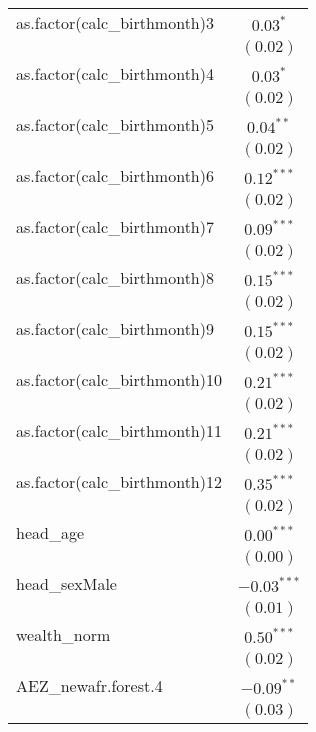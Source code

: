 \begin{longtable}{l c}
as.factor(calc\_birthmonth)3     & $0.03^{*}$     \\
                                 & $(0.02)$       \\
as.factor(calc\_birthmonth)4     & $0.03^{*}$     \\
                                 & $(0.02)$       \\
as.factor(calc\_birthmonth)5     & $0.04^{**}$    \\
                                 & $(0.02)$       \\
as.factor(calc\_birthmonth)6     & $0.12^{***}$   \\
                                 & $(0.02)$       \\
as.factor(calc\_birthmonth)7     & $0.09^{***}$   \\
                                 & $(0.02)$       \\
as.factor(calc\_birthmonth)8     & $0.15^{***}$   \\
                                 & $(0.02)$       \\
as.factor(calc\_birthmonth)9     & $0.15^{***}$   \\
                                 & $(0.02)$       \\
as.factor(calc\_birthmonth)10    & $0.21^{***}$   \\
                                 & $(0.02)$       \\
as.factor(calc\_birthmonth)11    & $0.21^{***}$   \\
                                 & $(0.02)$       \\
as.factor(calc\_birthmonth)12    & $0.35^{***}$   \\
                                 & $(0.02)$       \\
head\_age                        & $0.00^{***}$   \\
                                 & $(0.00)$       \\
head\_sexMale                    & $-0.03^{***}$  \\
                                 & $(0.01)$       \\
wealth\_norm                     & $0.50^{***}$   \\
                                 & $(0.02)$       \\
AEZ\_newafr.forest.4             & $-0.09^{**}$   \\
                                 & $(0.03)$       \\

\end{longtable}

